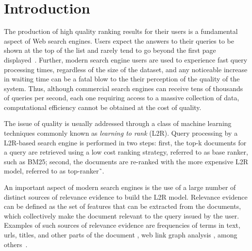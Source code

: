 \documentclass[preprint,review,10pt,3p]{elsarticle}
\begin{document}


\section{Introduction}
\label{intro}

The production of high quality ranking results for their users is a fundamental aspect of Web search engines. Users expect the answers to their queries to be shown at the top of the list and rarely tend to go beyond the first page displayed~\cite{saraiva2001rank}. 
Further, modern search engine users are used to experience fast query processing times, regardless of the size of the dataset, and any noticeable increase in waiting time can be a fatal blow to the their perception of the quality of the system. Thus, although commercial search engines can receive tens of thousands of queries per second, each one requiring access to a massive collection of data, computational efficiency cannot be obtained at the cost of quality. 

The issue of quality is usually addressed through a class of machine learning techniques commonly known as \textit{learning to rank} (L2R). Query processing by a L2R-based search engine is performed in two steps: first, the top-k documents for a query are retrieved using a low cost ranking strategy,  referred to as base ranker, such as BM25; second, the documents are re-ranked with the more expensive L2R model, referred to as top-ranker˜\cite{capannini2016quality}.

An important aspect of modern search engines is the use of a large number of distinct sources of relevance evidence to build the L2R model. Relevance evidence can be defined as the set of features that can be extracted from the documents, which collectively make the document relevant to the query issued by the user. Examples of such sources of relevance evidence are frequencies of terms in text, urls, titles, and other parts of the document
, web link graph analysis
, among others~\cite{baezaribeiro2011modinforet}. 
\end{document}
